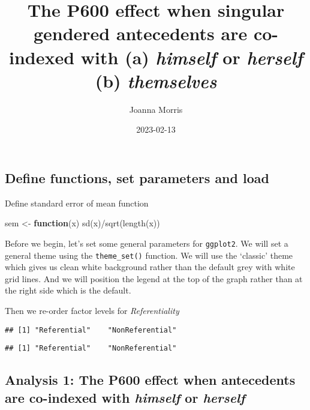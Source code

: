 \documentclass[
]{article}
\title{The P600 effect when singular gendered antecedents are co-indexed
with (a) \emph{himself} or \emph{herself} (b) \emph{themselves}}
\author{Joanna Morris}
\date{2023-02-13}
\newenvironment{Shaded}{\begin{snugshade}}{\end{snugshade}}
\newcommand{\ControlFlowTok}[1]{\textcolor[rgb]{0.13,0.29,0.53}{\textbf{#1}}}
\newcommand{\FunctionTok}[1]{\textcolor[rgb]{0.00,0.00,0.00}{#1}}
\newcommand{\NormalTok}[1]{#1}
\newcommand{\OtherTok}[1]{\textcolor[rgb]{0.56,0.35,0.01}{#1}}
\newcommand{\SpecialCharTok}[1]{\textcolor[rgb]{0.00,0.00,0.00}{#1}}
\begin{document}
\maketitle

\hypertarget{define-functions-set-parameters-and-load}{%
\subsection{Define functions, set parameters and
load}\label{define-functions-set-parameters-and-load}}

Define standard error of mean function

\begin{Shaded}
\begin{Highlighting}[]
\NormalTok{sem }\OtherTok{\textless{}{-}} \ControlFlowTok{function}\NormalTok{(x) }\FunctionTok{sd}\NormalTok{(x)}\SpecialCharTok{/}\FunctionTok{sqrt}\NormalTok{(}\FunctionTok{length}\NormalTok{(x))}
\end{Highlighting}
\end{Shaded}

Before we begin, let's set some general parameters for \texttt{ggplot2}.
We will set a general theme using the \texttt{theme\_set()} function. We
will use the `classic' theme which gives us clean white background
rather than the default grey with white grid lines. And we will position
the legend at the top of the graph rather than at the right side which
is the default.

Then we re-order factor levels for \emph{Referentiality}

\begin{verbatim}
## [1] "Referential"    "NonReferential"
\end{verbatim}

\begin{verbatim}
## [1] "Referential"    "NonReferential"
\end{verbatim}

\hypertarget{analysis-1-the-p600-effect-when-antecedents-are-co-indexed-with-himself-or-herself}{%
\subsection{\texorpdfstring{Analysis 1: The P600 effect when antecedents
are co-indexed with \emph{himself} or
\emph{herself}}{Analysis 1: The P600 effect when antecedents are co-indexed with himself or herself}}\label{analysis-1-the-p600-effect-when-antecedents-are-co-indexed-with-himself-or-herself}}
\end{document}
